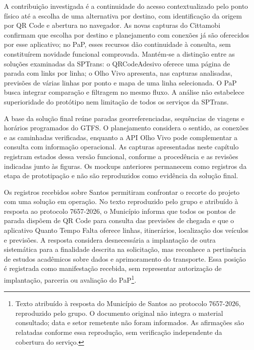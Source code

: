 \documentclass[12pt,oneside,a4paper,brazil,chapter=TITLE]{abntex2}
\begin{document}
A contribuição investigada é a continuidade do acesso contextualizado pelo ponto físico até a escolha de uma alternativa por destino, com identificação da origem por QR Code e abertura no navegador. As novas capturas do Cittamobi confirmam que escolha por destino e planejamento com conexões já são oferecidos por esse aplicativo; no PaP, esses recursos dão continuidade à consulta, sem constituírem novidade funcional comprovada. Mantém-se a distinção entre as soluções examinadas da SPTrans: o QRCodeAdesivo oferece uma página de parada com links por linha; o Olho Vivo apresenta, nas capturas analisadas, previsões de várias linhas por ponto e mapa de uma linha selecionada. O PaP busca integrar comparação e filtragem no mesmo fluxo. A análise não estabelece superioridade do protótipo nem limitação de todos os serviços da SPTrans.


A base da solução final reúne paradas georreferenciadas, sequências de viagens e horários programados do GTFS. O planejamento considera o sentido, as conexões e as caminhadas verificadas, enquanto a API Olho Vivo pode complementar a consulta com informação operacional. As capturas apresentadas neste capítulo registram estados dessa versão funcional, conforme a procedência e as revisões indicadas junto às figuras. Os mockups anteriores permanecem como registros da etapa de prototipação e não são reproduzidos como evidência da solução final.

Os registros recebidos sobre Santos permitiram confrontar o recorte do projeto com uma solução em operação. No texto reproduzido pelo grupo e atribuído à resposta ao protocolo 7657-2026, o Município informa que todos os pontos de parada dispõem de QR Code para consulta das previsões de chegada e que o aplicativo Quanto Tempo Falta oferece linhas, itinerários, localização dos veículos e previsões. A resposta considera desnecessária a implantação de outra sistemática para a finalidade descrita na solicitação, mas reconhece a pertinência de estudos acadêmicos sobre dados e aprimoramento do transporte. Essa posição é registrada como manifestação recebida, sem representar autorização de implantação, parceria ou avaliação do PaP\footnote{Texto atribuído à resposta do Município de Santos ao protocolo 7657-2026, reproduzido pelo grupo. O documento original não integra o material consultado; data e setor remetente não foram informados. As afirmações são relatadas conforme essa reprodução, sem verificação independente da cobertura do serviço.}.
\end{document}
